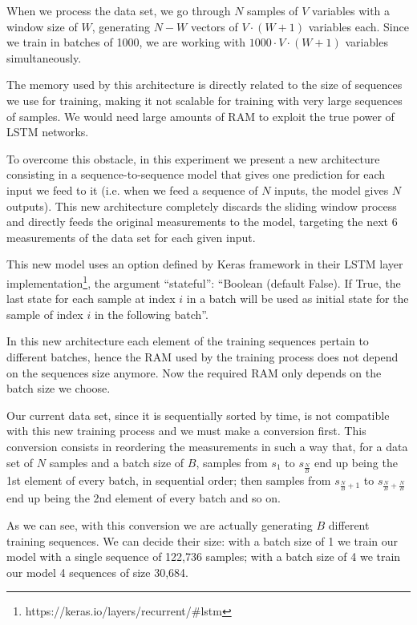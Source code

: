 \documentclass[]{article}
\begin{document}
When we process the data set, we go through $ N $ samples of $ V $ variables with a window size of $ W $, generating $ N - W $ vectors of $ V \cdot (W + 1) $ variables each. Since we train in batches of 1000, we are working with $ 1000 \cdot V \cdot (W + 1) $ variables simultaneously.

The memory used by this architecture is directly related to the size of sequences we use for training, making it not scalable for training with very large sequences of samples. We would need large amounts of RAM to exploit the true power of LSTM networks.

To overcome this obstacle, in this experiment we present a new architecture consisting in a sequence-to-sequence model that gives one prediction for each input we feed to it (i.e. when we feed a sequence of $ N $ inputs, the model gives $ N $ outputs). This new architecture completely discards the sliding window process and directly feeds the original measurements to the model, targeting the next 6 measurements of the data set for each given input.

This new model uses an option defined by Keras framework in their LSTM layer implementation\footnote{https://keras.io/layers/recurrent/\#lstm}, the argument ``stateful'': ``Boolean (default False). If True, the last state for each sample at index $ i $ in a batch will be used as initial state for the sample of index $ i $ in the following batch''.

In this new architecture each element of the training sequences pertain to different batches, hence the RAM used by the training process does not depend on the sequences size anymore. Now the required RAM only depends on the batch size we choose.

Our current data set, since it is sequentially sorted by time, is not compatible with this new training process and we must make a conversion first. This conversion consists in reordering the measurements in such a way that, for a data set of $ N $ samples and a batch size of $ B $, samples from $ s_1 $ to $ s_{\frac{N}{B}} $ end up being the 1st element of every batch, in sequential order; then samples from $ s_{\frac{N}{B}+1} $ to $ s_{\frac{N}{B}+\frac{N}{B}} $ end up being the 2nd element of every batch and so on.

As we can see, with this conversion we are actually generating $ B $ different training sequences. We can decide their size: with a batch size of 1 we train our model with a single sequence of 122,736 samples; with a batch size of 4 we train our model 4 sequences of size 30,684.
\end{document}

